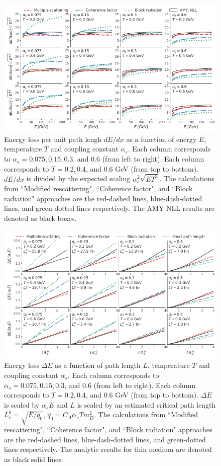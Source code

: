 \documentclass[aps, prc, reprint, amsmath, groupedaddress, nofootinbib]{revtex4-1}
\begin{document}
\begin{figure}
\includegraphics[width=\textwidth]{Eloss_infinite.pdf}
\caption{Energy loss per unit path lengh $dE/dx$ as a function of energy $E$, temperature $T$ and coupling constant $\alpha_s$. Each column corresponds to $\alpha_s = 0.075, 0.15, 0.3$, and $0.6$ (from left to right). Each column corresponds to $T = 0.2, 0.4$, and $0.6$ GeV (from top to bottom). $dE/dx$ is divided by the expected scaling $\alpha_s^2 \sqrt{ET^3}$. The calculations from ``Modified rescattering", ``Coherence factor", and ``Block radiation" approaches are the red-dashed lines, blue-dash-dotted lines, and green-dotted lines respectively. The AMY NLL results are denoted as black boxes.}
\label{fig:eloss-inf}
\end{figure}

\begin{figure}
\includegraphics[width=\textwidth]{Eloss_Ldep.pdf}
\caption{Energy loss $\Delta E$ as a function of path length $L$, temperature $T$ and coupling constant $\alpha_s$. Each column corresponds to $\alpha_s = 0.075, 0.15, 0.3$, and $0.6$ (from left to right). Each column corresponds to $T = 0.2, 0.4$, and $0.6$ GeV (from top to bottom). $\Delta E$ is scaled by $\alpha_s E$ and $L$ is scaled by an estimated critical path length $L_c^0 = \sqrt{E/\hat{q}_0}$, $\hat{q}_0 = C_A \alpha_s T m_D^2$. The calculations from ``Modified rescattering", ``Coherence factor", and ``Block radiation" approaches are the red-dashed lines, blue-dash-dotted lines, and green-dotted lines respectively. The analytic results for thin medium are denoted as black solid lines.}
\label{fig:eloss-ldep}
\end{figure}
\end{document}
